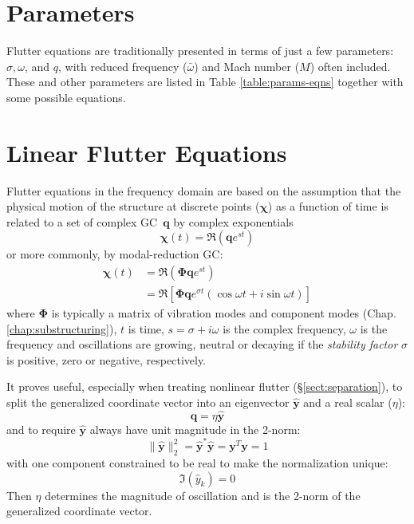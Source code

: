 \documentclass[10pt,openany,twoside]{book}
\numberwithin{equation}{section}   %
\newcommand{\Newterm}[1]{{\em #1}}
\newcommand{\Matrix}[1]{\boldsymbol{#1}}
\newcommand{\Vector}[1]{\boldsymbol{#1}}
\newcommand{\Gc}{GC}
\newcommand{\Sectref}[1]{\S\ref{#1}}
\newcommand{\Chapref}[1]{Chap. \ref{#1}}
\newcommand{\Tableref}[1]{Table \ref{#1}}
\begin{document}
\section{Parameters}
Flutter equations are traditionally presented in terms of just a few
parameters: $\sigma, \omega$, and $q$, with reduced frequency ($\bar\omega$)
and Mach number ($M$) often included. These and other parameters are
listed in \Tableref{table:params-eqns} together with some possible equations.



\section{Linear Flutter Equations}\label{sect:complexflutter}
Flutter equations in the frequency domain are based on
the assumption that the physical motion of the structure at discrete points
($\Vector{\chi}$) as a function of time
is related to a set of complex \Gc\
$\Vector{q}$ by complex exponentials
\begin{equation}
\Vector{\chi}(t) = \Re(\Vector{q}e^{st})
\end{equation}
or more commonly, by modal-reduction \Gc:
\begin{align} \label{eqn:motion}
\Vector{\chi}(t) & =  \Re \left(\Matrix{\Phi}\Vector{q}e^{st}\right) \nonumber \\
              & =  \Re \left[\Matrix{\Phi}\Vector{q} e^{\sigma t}
				  			\left(\cos \omega t + i \sin \omega t \right) \right]
\end{align}
where $\Matrix{\Phi}$ \index{=Phi@$\Matrix{\Phi}$!modal reduction} is typically
a matrix of vibration modes and component modes (\Chapref{chap:substructuring}),
$t$ is time, $s = \sigma + i\omega$ is the complex frequency, $\omega$
is the frequency and oscillations are growing, neutral or decaying if the
\Newterm{stability factor} $\sigma$ is positive, zero or negative, respectively.

It proves useful, especially when treating nonlinear flutter
(\Sectref{sect:separation}), to split the generalized
coordinate vector into an eigenvector $\hat{\Vector{y}}$
and a real scalar ($\eta$):
\begin{equation}\label{eqn:gcsplit}
	\Vector{q} = \eta \hat{\Vector{y}}
\end{equation}
and to require $\hat{\Vector{y}}$ always have unit magnitude in the 2-norm:
\begin{equation}\label{eqn:normalization}
	\|\hat{\Vector{y}}\|_2^2 = \hat{\Vector{y}}^*\hat{\Vector{y}} = \Vector{y}^T\Vector{y} = 1
\end{equation}
with one component constrained to be real to make the normalization unique:
\begin{equation}\label{eqn:phase}
 	\Im(\hat{y}_k) = 0
\end{equation}
Then $\eta$ determines the magnitude of oscillation and is the 2-norm
of the generalized coordinate vector.
\end{document}
